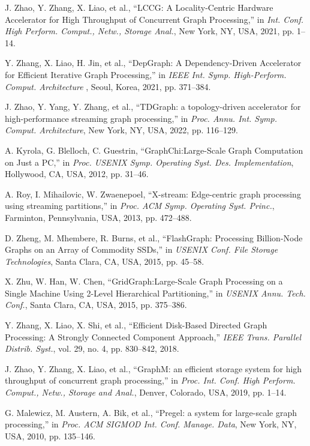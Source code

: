 \documentclass[lettersize,journal]{IEEEtran}
\begin{document}
\begin{thebibliography}{100}
J. Zhao, Y. Zhang, X. Liao, et al., ``LCCG: A Locality-Centric Hardware Accelerator for High Throughput of Concurrent Graph Processing,'' in \textit{Int. Conf. High Perform. Comput., Netw., Storage Anal.}, New York, NY, USA, 2021, pp. 1--14.

Y. Zhang, X. Liao, H. Jin, et al., ``DepGraph: A Dependency-Driven Accelerator for Efficient Iterative Graph Processing,'' in \textit{IEEE Int. Symp. High-Perform. Comput. Architecture }, Seoul, Korea, 2021, pp. 371--384.

J. Zhao, Y. Yang, Y. Zhang, et al., ``TDGraph: a topology-driven accelerator for high-performance streaming graph processing,'' in \textit{Proc. Annu. Int. Symp. Comput. Architecture}, New York, NY, USA, 2022, pp. 116--129.

A. Kyrola, G. Blelloch, C. Guestrin, ``{GraphChi}:{Large-Scale} Graph Computation on Just a {PC},'' in \textit{Proc. USENIX Symp. Operating Syst. Des. Implementation}, Hollywood, CA, USA, 2012, pp. 31--46.

A. Roy, I. Mihailovic, W. Zwaenepoel,  ``X-stream: Edge-centric graph processing using streaming partitions,'' in \textit{Proc. ACM Symp. Operating Syst. Princ.}, Farminton, Pennsylvania, USA, 2013, pp. 472--488.

D. Zheng, M. Mhembere, R. Burns, et al., ``{FlashGraph}: Processing {Billion-Node} Graphs on an Array of Commodity {SSDs},'' in \textit{USENIX Conf. File Storage Technologies}, Santa Clara, CA, USA, 2015, pp. 45--58.

X. Zhu, W. Han, W. Chen, ``{GridGraph}:{Large-Scale} Graph Processing on a Single Machine Using 2-Level Hierarchical Partitioning,'' in \textit{USENIX Annu. Tech. Conf.}, Santa Clara, CA, USA, 2015, pp. 375--386.

Y. Zhang, X. Liao, X. Shi, et al., ``Efficient Disk-Based Directed Graph Processing: A Strongly Connected Component Approach,'' \textit{IEEE Trans. Parallel Distrib. Syst.}, vol. 29, no. 4, pp. 830--842, 2018.

J. Zhao, Y. Zhang, X. Liao, et al., ``GraphM: an efficient storage system for high throughput of concurrent graph processing,'' in \textit{Proc. Int. Conf. High Perform. Comput., Netw., Storage and Anal.}, Denver, Colorado, USA, 2019, pp. 1--14.

G. Malewicz, M. Austern, A. Bik, et al., ``Pregel: a system for large-scale graph processing,'' in \textit{Proc. ACM SIGMOD Int. Conf. Manage. Data}, New York, NY, USA, 2010, pp. 135--146.


\end{thebibliography}
\end{document}
